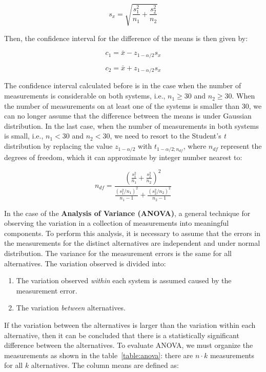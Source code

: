 \begin{equation}
  s_x = \sqrt{\frac{s_1^2}{n_1} + \frac{s_2^2}{n_2}}
\end{equation}

Then, the confidence interval for the difference of the means is then given
by:

\begin{equation}
  c_1 = \bar{x} - z_{1 - \alpha/2}s_x
\end{equation}

\begin{equation}
 c_2 = \bar{x} + z_{1 - \alpha/2}s_x
\end{equation}

The confidence interval calculated before is in the case when the number of
measurements is considerable on both systems, i.e., \(n_1 \ge 30\) and \(n_2
   \ge 30\). When the number of measurements on at least one of the systems is
smaller than 30, we can no longer assume that the difference between the means is
under Gaussian distribution. In the last case, when the number of
measurements in both systems is small, i.e., \(n_1 < 30\) and \(n_2 < 30\),
we need to resort to the Student's \emph{t} distribution by replacing the value
\(z_{1 - \alpha/2}\) with \(t_{1 - \alpha/2;n_{df}}\), where \(n_{df}\)
represent the degrees of freedom, which it can approximate by integer number
nearest to:

\begin{equation}
 n_{df} = \frac{(\frac{s_1^2}{n_1} + \frac{s_2^2}{n_2})^2}{\frac{(s_1^2/n_1)^2}{n_1 - 1} + \frac{(s_2^2/n_2)^2}{n_2 - 1}}
\end{equation}

In the case of the \textbf{Analysis of Variance (ANOVA)}, a general technique
for observing the variation in a collection of measurements into meaningful
components. To perform this analysis, it is necessary to assume that the errors
in the measurements for the distinct alternatives are independent and under
normal distribution. The variance for the measurement errors is the same
for all alternatives. The variation observed is divided into:

\begin{enumerate}
\item The variation observed \emph{within} each system is assumed caused by the
measurement error.
\item The variation \emph{between} alternatives.
\end{enumerate}

If the variation between the alternatives is larger than the variation within each alternative, then it can be concluded that there is a statistically significant difference between the alternatives. To evaluate ANOVA, we must organize the measurements as shown in the table~\ref{table:anova}: there are \(n \cdot k\) measurements for all \(k\) alternatives. The column means are defined as:

